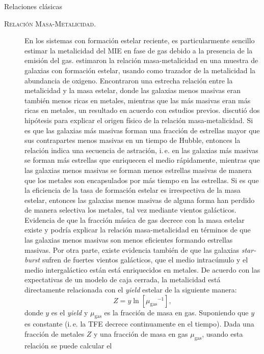 \documentclass[xcolor=dvipsnames,4pt,hyperref={colorlinks,citecolor=black,linkcolor=black,urlcolor=black}]{beamer}
\begin{document}
\begin{frame}{Relaciones clásicas}
\begin{description}
\item[\textsc{Relación Masa-Metalicidad.}] En los sistemas con formación estelar reciente, es
particularmente sencillo estimar la metalicidad del MIE en fase de gas debido a la presencia de la
emisión del gas. \citet{Tremonti2004} estimaron la relación masa-metalicidad en una muestra de
galaxias con formación estelar, usando como trazador de la metalicidad la abundancia de oxigeno.
Encontraron una estrecha relación entre la metalicidad y la masa estelar, donde las galaxias menos
masivas eran también menos ricas en metales, mientras que las más masivas eran más ricas en metales,
un resultado en acuerdo con estudios previos.
\citeauthor{Tremonti2004} discutió dos hipótesis para explicar el origen físico de la relación
masa-metalicidad. Si es que las galaxias más masivas forman una fracción de estrellas mayor que sus
contrapartes menos masivas en un tiempo de Hubble, entonces la relación indica una secuencia de
astración, i.\,e. en las galaxias más masivas se forman más estrellas que enriquecen el medio
rápidamente, mientras que las galaxias menos masivas se forman menos estrellas masivas de manera que
los metales son encapsulados por más tiempo en las estrellas.
Si es que la eficiencia de la tasa de formación estelar es irrespectiva de la masa estelar, entonces
las galaxias menos masivas de alguna forma han perdido de manera selectiva los metales, tal vez
mediante vientos galácticos.
Evidencia de que la fracción másica de gas decrece con la masa estelar existe \citep{Bell2000} y
podría explicar la relación masa-metalicidad en términos de que las galaxias menos masivas son menos
eficientes formando estrellas masivas. Por otra parte, existe evidencia también de que las galaxias
\emph{star-burst} sufren de fuertes vientos galácticos, que el medio intracúmulo y el medio
intergaláctico están está enriquecidos en metales.
%
De acuerdo con las expectativas de un modelo de caja cerrada, la metalicidad está directamente
relacionada con el \emph{yield} estelar de la siguiente manera:
%
$$
Z = y\ln{\left[{\mu_\text{gas}}^{-1}\right]},
$$
%
donde $y$ es el \emph{yield} y $\mu_\text{gas}$ es la fracción de masa en gas. Suponiendo que $y$ es
constante (i.\,e. la TFE decrece \alert{continuamente} en el tiempo). Dada una fracción de metales
$Z$ y una fracción de masa en gas $\mu_\text{gas}$, usando esta relación se puede calcular el

\end{description}
\end{frame}
\end{document}
